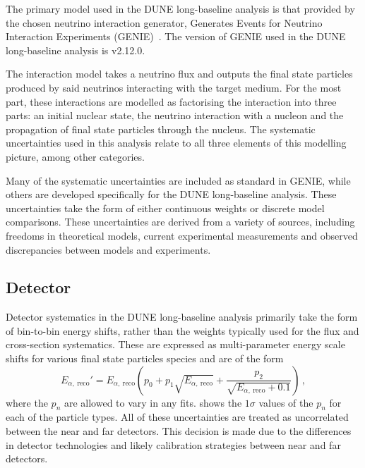The primary model used in the DUNE long-baseline analysis is that provided by the chosen neutrino interaction generator, Generates Events for Neutrino Interaction Experiments (GENIE)~\cite{genie}.
The version of GENIE used in the DUNE long-baseline analysis is v2.12.0.

The interaction model takes a neutrino flux and outputs the final state particles produced by said neutrinos interacting with the target medium.
For the most part, these interactions are modelled as factorising the interaction into three parts: an initial nuclear state, the neutrino interaction with a nucleon and the propagation of final state particles through the nucleus.
The systematic uncertainties used in this analysis relate to all three elements of this modelling picture, among other categories.

Many of the systematic uncertainties are included as standard in GENIE, while others are developed specifically for the DUNE long-baseline analysis.
These uncertainties take the form of either continuous weights or discrete model comparisons.
These uncertainties are derived from a variety of sources, including freedoms in theoretical models, current experimental measurements and observed discrepancies between models and experiments.

\subsection{Detector}
\label{sec:dune_lbl:systs:det}

Detector systematics in the DUNE long-baseline analysis primarily take the form of bin-to-bin energy shifts, rather than the weights typically used for the flux and cross-section systematics.
These are expressed as multi-parameter energy scale shifts for various final state particles species and are of the form
\begin{equation}
E_{\alpha,~\text{reco}}' = E_{\alpha,~\text{reco}} \left( p_{0} + p_{1} \sqrt{E_{\alpha,~\text{reco}}} + \frac{p_{2}}{\sqrt{E_{\alpha,~\text{reco}}+0.1}} \right) \, ,
\label{eq:energyResponse}	
\end{equation}
where the $p_{n}$ are allowed to vary in any fits.
 shows the $1\sigma$ values of the $p_{n}$ for each of the particle types.
All of these uncertainties are treated as uncorrelated between the near and far detectors.
This decision is made due to the differences in detector technologies and likely calibration strategies between near and far detectors.

